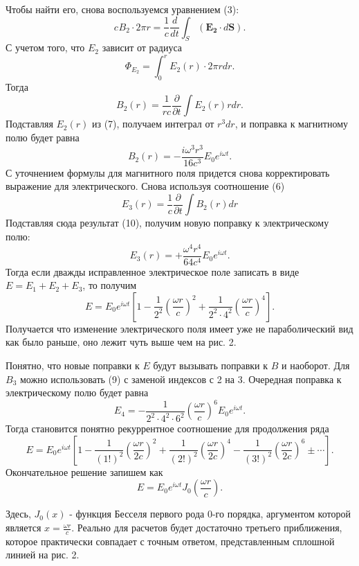 \documentclass[a4paper, 12pt]{article}
\begin{document}
Чтобы найти его, снова воспользуемся уравнением (3):
\begin{displaymath}c^{} B_{2} \cdot 2 \pi r=\frac{1}{c}\frac{d}{d t} \int_{S} (\boldsymbol{E_{2}} \cdot d\boldsymbol{S}).\end{displaymath}
С учетом того, что $E_{2}$ зависит от радиуса
\begin{displaymath}\Phi_{E_{2}}=\int_{0}^{r} E_{2}(r) \cdot 2 \pi r d r.\end{displaymath}
Тогда
\begin{equation}B_{2}(r)=\frac{1}{r c} \frac{\partial}{\partial t} \int E_{2}(r) r d r.\end{equation}
Подставляя $E_{2}(r)$ из (7), получаем интеграл от $r^{3} d r$, и поправка к магнитному полю будет равна
\begin{equation}B_{2}(r)=-\frac{i \omega^{3} r^{3}}{16 c^{3}} E_{0} e^{i \omega t}.\end{equation}
С уточнением формулы для магнитного поля придется снова корректировать выражение для электрического. Снова используя соотношение (6)
\begin{equation}E_{3}(r)=\frac{1}{c}\frac{\partial}{\partial t} \int B_{2}(r) d r\end{equation}
Подставляя сюда результат (10), получим новую поправку к электрическому полю:
\begin{equation}E_{3}(r)=+\frac{\omega^{4} r^{4}}{64 c^{4}} E_{0} e^{i \omega t}.\end{equation}
Тогда если дважды исправленное электрическое поле записать в виде $E=E_{1}+E_{2}+E_{3}$, то получим
\begin{equation}E=E_{0} e^{i \omega t}\left[1-\frac{1}{2^{2}}\left(\frac{\omega r}{c}\right)^{2}+\frac{1}{2^{2} \cdot 4^{2}}\left(\frac{\omega r}{c}\right)^{4}\right].\end{equation}
Получается что изменение электрического поля имеет уже не параболический вид как было раньше, оно лежит чуть выше чем на рис. 2.

Понятно, что новые поправки к $E$ будут вызывать поправки к $B$ и наоборот. Для $B_{3}$ можно использовать (9) с заменой индексов с 2 на 3. Очередная поправка к электрическому полю будет равна
\begin{displaymath}E_{4}=-\frac{1}{2^{2} \cdot 4^{2} \cdot 6^{2}}\left(\frac{\omega r}{c}\right)^{6} E_{0} e^{i \omega t}.\end{displaymath}
Тогда становится понятно рекуррентное соотношение для продолжения ряда
\begin{equation}E=E_{0} e^{i \omega t}\left[1-\frac{1}{(1 !)^{2}}\left(\frac{\omega r}{2 c}\right)^{2}+\frac{1}{(2 !)^{2}}\left(\frac{\omega r}{2 c}\right)^{4}-\frac{1}{(3 !)^{2}}\left(\frac{\omega r}{2 c}\right)^{6} \pm \cdots\right].\end{equation}
Окончательное решение запишем как
\begin{equation}E=E_{0} e^{i \omega t} J_{0} \left(\frac{\omega r}{c}\right).\end{equation}

Здесь, $J_{0}(x)$ - функция Бесселя первого рода 0-го порядка, аргументом которой является $x=\frac{\omega r}{c}$. Реально для расчетов будет достаточно третьего приближения, которое практически совпадает с точным ответом, представленным сплошной линией на рис. 2.
\end{document}
